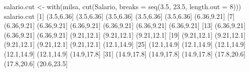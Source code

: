 \documentclass[
  10pt,
  a4paper]{book}
\newenvironment{Shaded}{\begin{snugshade}}{\end{snugshade}}
\newcommand{\AttributeTok}[1]{\textcolor[rgb]{0.77,0.63,0.00}{#1}}
\newcommand{\DecValTok}[1]{\textcolor[rgb]{0.00,0.00,0.81}{#1}}
\newcommand{\FloatTok}[1]{\textcolor[rgb]{0.00,0.00,0.81}{#1}}
\newcommand{\FunctionTok}[1]{\textcolor[rgb]{0.00,0.00,0.00}{#1}}
\newcommand{\NormalTok}[1]{#1}
\newcommand{\OtherTok}[1]{\textcolor[rgb]{0.56,0.35,0.01}{#1}}
\begin{document}
\begin{Shaded}
\begin{Highlighting}[]
\NormalTok{salario.cut }\OtherTok{\textless{}{-}} \FunctionTok{with}\NormalTok{(milsa,}
                    \FunctionTok{cut}\NormalTok{(Salario, }\AttributeTok{breaks =} \FunctionTok{seq}\NormalTok{(}\FloatTok{3.5}\NormalTok{, }\FloatTok{23.5}\NormalTok{, }\AttributeTok{length.out =} \DecValTok{8}\NormalTok{)))}
\NormalTok{salario.cut}
\NormalTok{ [}\DecValTok{1}\NormalTok{] (}\FloatTok{3.5}\NormalTok{,}\FloatTok{6.36}\NormalTok{]  (}\FloatTok{3.5}\NormalTok{,}\FloatTok{6.36}\NormalTok{]  (}\FloatTok{3.5}\NormalTok{,}\FloatTok{6.36}\NormalTok{]  (}\FloatTok{3.5}\NormalTok{,}\FloatTok{6.36}\NormalTok{]  (}\FloatTok{3.5}\NormalTok{,}\FloatTok{6.36}\NormalTok{]  (}\FloatTok{6.36}\NormalTok{,}\FloatTok{9.21}\NormalTok{]}
\NormalTok{ [}\DecValTok{7}\NormalTok{] (}\FloatTok{6.36}\NormalTok{,}\FloatTok{9.21}\NormalTok{] (}\FloatTok{6.36}\NormalTok{,}\FloatTok{9.21}\NormalTok{] (}\FloatTok{6.36}\NormalTok{,}\FloatTok{9.21}\NormalTok{] (}\FloatTok{6.36}\NormalTok{,}\FloatTok{9.21}\NormalTok{] (}\FloatTok{6.36}\NormalTok{,}\FloatTok{9.21}\NormalTok{] (}\FloatTok{6.36}\NormalTok{,}\FloatTok{9.21}\NormalTok{]}
\NormalTok{[}\DecValTok{13}\NormalTok{] (}\FloatTok{6.36}\NormalTok{,}\FloatTok{9.21}\NormalTok{] (}\FloatTok{6.36}\NormalTok{,}\FloatTok{9.21}\NormalTok{] (}\FloatTok{6.36}\NormalTok{,}\FloatTok{9.21}\NormalTok{] (}\FloatTok{9.21}\NormalTok{,}\FloatTok{12.1}\NormalTok{] (}\FloatTok{9.21}\NormalTok{,}\FloatTok{12.1}\NormalTok{] (}\FloatTok{9.21}\NormalTok{,}\FloatTok{12.1}\NormalTok{]}
\NormalTok{[}\DecValTok{19}\NormalTok{] (}\FloatTok{9.21}\NormalTok{,}\FloatTok{12.1}\NormalTok{] (}\FloatTok{9.21}\NormalTok{,}\FloatTok{12.1}\NormalTok{] (}\FloatTok{9.21}\NormalTok{,}\FloatTok{12.1}\NormalTok{] (}\FloatTok{9.21}\NormalTok{,}\FloatTok{12.1}\NormalTok{] (}\FloatTok{9.21}\NormalTok{,}\FloatTok{12.1}\NormalTok{] (}\FloatTok{12.1}\NormalTok{,}\FloatTok{14.9}\NormalTok{]}
\NormalTok{[}\DecValTok{25}\NormalTok{] (}\FloatTok{12.1}\NormalTok{,}\FloatTok{14.9}\NormalTok{] (}\FloatTok{12.1}\NormalTok{,}\FloatTok{14.9}\NormalTok{] (}\FloatTok{12.1}\NormalTok{,}\FloatTok{14.9}\NormalTok{] (}\FloatTok{12.1}\NormalTok{,}\FloatTok{14.9}\NormalTok{] (}\FloatTok{12.1}\NormalTok{,}\FloatTok{14.9}\NormalTok{] (}\FloatTok{14.9}\NormalTok{,}\FloatTok{17.8}\NormalTok{]}
\NormalTok{[}\DecValTok{31}\NormalTok{] (}\FloatTok{14.9}\NormalTok{,}\FloatTok{17.8}\NormalTok{] (}\FloatTok{14.9}\NormalTok{,}\FloatTok{17.8}\NormalTok{] (}\FloatTok{14.9}\NormalTok{,}\FloatTok{17.8}\NormalTok{] (}\FloatTok{17.8}\NormalTok{,}\FloatTok{20.6}\NormalTok{] (}\FloatTok{17.8}\NormalTok{,}\FloatTok{20.6}\NormalTok{] (}\FloatTok{20.6}\NormalTok{,}\FloatTok{23.5}\NormalTok{]}

\end{Highlighting}
\end{Shaded}
\end{document}
